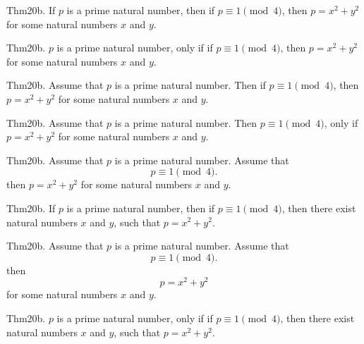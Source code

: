 \documentclass{article}
\begin{document}
Thm20b. If $p$ is a prime natural number, then if $p \equiv 1 \pmod{ 4}$, then $p = x ^{ 2}+ y ^{ 2}$ for some natural numbers $x$ and $y$.

Thm20b. $p$ is a prime natural number, only if if $p \equiv 1 \pmod{ 4}$, then $p = x ^{ 2}+ y ^{ 2}$ for some natural numbers $x$ and $y$.

Thm20b. Assume that $p$ is a prime natural number. Then if $p \equiv 1 \pmod{ 4}$, then $p = x ^{ 2}+ y ^{ 2}$ for some natural numbers $x$ and $y$.

Thm20b. Assume that $p$ is a prime natural number. Then $p \equiv 1 \pmod{ 4}$, only if $p = x ^{ 2}+ y ^{ 2}$ for some natural numbers $x$ and $y$.

Thm20b. Assume that $p$ is a prime natural number. Assume that $$p \equiv 1 \pmod{ 4}.$$ then $p = x ^{ 2}+ y ^{ 2}$ for some natural numbers $x$ and $y$.

Thm20b. If $p$ is a prime natural number, then if $p \equiv 1 \pmod{ 4}$, then there exist natural numbers $x$ and $y$, such that $p = x ^{ 2}+ y ^{ 2}$.

Thm20b. Assume that $p$ is a prime natural number. Assume that $$p \equiv 1 \pmod{ 4}.$$ then $$p = x ^{ 2}+ y ^{ 2}$$ for some natural numbers $x$ and $y$.

Thm20b. $p$ is a prime natural number, only if if $p \equiv 1 \pmod{ 4}$, then there exist natural numbers $x$ and $y$, such that $p = x ^{ 2}+ y ^{ 2}$.
\end{document}
